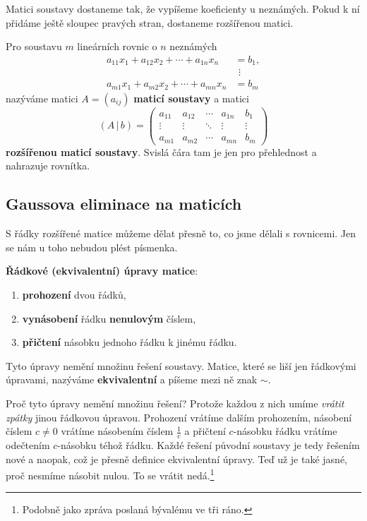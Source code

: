 Matici soustavy dostaneme tak, že vypíšeme koeficienty u neznámých. Pokud k ní přidáme ještě sloupec pravých stran, dostaneme rozšířenou matici.

\begin{definitionbox}
  Pro soustavu $m$ lineárních rovnic o $n$ neznámých
  \begin{align*}
    a_{11}x_1 + a_{12}x_2 + \cdots + a_{1n}x_n &= b_1,\\
    &\ \,\vdots\\
    a_{m1}x_1 + a_{m2}x_2 + \cdots + a_{mn}x_n &= b_m
  \end{align*}
  nazýváme matici $A = (a_{ij})$ \textbf{maticí soustavy} a matici
  \begin{equation*}
    (A\,|\,b) = \left(\begin{array}{cccc|c}
      a_{11} & a_{12} & \cdots & a_{1n} & b_1\\
      \vdots & \vdots & \ddots & \vdots & \vdots\\
      a_{m1} & a_{m2} & \cdots & a_{mn} & b_m
    \end{array}\right)
  \end{equation*}
  \textbf{rozšířenou maticí soustavy}. Svislá čára tam je jen pro přehlednost a nahrazuje rovnítka.
\end{definitionbox}

\subsection{Gaussova eliminace na maticích}\label{sec:gaussova-eliminace}

S řádky rozšířené matice můžeme dělat přesně to, co jsme dělali s rovnicemi. Jen se nám u toho nebudou plést písmenka.

\begin{definitionbox}
  \textbf{Řádkové (ekvivalentní) úpravy matice}:
  \begin{enumerate}
    \item \textbf{prohození} dvou řádků,
    \item \textbf{vynásobení} řádku \textbf{nenulovým} číslem,
    \item \textbf{přičtení} násobku jednoho řádku k jinému řádku.
  \end{enumerate}
  Tyto úpravy nemění množinu řešení soustavy. Matice, které se liší jen řádkovými úpravami, nazýváme \textbf{ekvivalentní} a píšeme mezi ně znak $\sim$.
\end{definitionbox}

Proč tyto úpravy nemění množinu řešení? Protože každou z nich umíme \textit{vrátit zpátky} jinou řádkovou úpravou. Prohození vrátíme dalším prohozením, násobení číslem $c\neq 0$ vrátíme násobením číslem $\frac{1}{c}$ a přičtení $c$-násobku řádku vrátíme odečtením $c$-násobku téhož řádku. Každé řešení původní soustavy je tedy řešením nové a naopak, což je přesně definice ekvivalentní úpravy. Teď už je také jasné, proč nesmíme násobit nulou. To se vrátit nedá.\footnote{Podobně jako zpráva poslaná bývalému ve tři ráno.}

